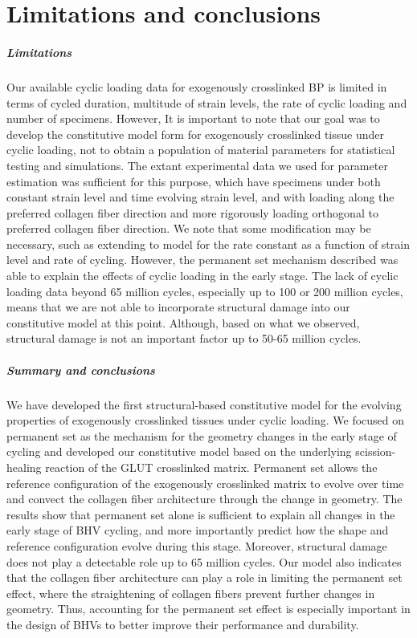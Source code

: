 \section{Limitations and conclusions}

\subparagraph{Limitations} 
	Our available cyclic loading data for exogenously crosslinked BP is limited in terms of cycled duration, multitude of strain levels, the rate of cyclic loading and number of specimens. 
	However, It is important to note that our goal was to develop the constitutive model form for exogenously crosslinked tissue under cyclic loading, not to obtain a population of material parameters for statistical testing and simulations. 
	The extant experimental data we used for parameter estimation was sufficient for this purpose, which have specimens under both constant strain level and time evolving strain level, and with loading along the preferred collagen fiber direction and more rigorously loading orthogonal to preferred collagen fiber direction.
	We note that some modification may be necessary, such as extending to model for the rate constant as a function of strain level and rate of cycling. 
	However, the permanent set mechanism described was able to explain the effects of cyclic loading in the early stage. 
	The lack of cyclic loading data beyond 65 million cycles, especially up to 100 or 200 million cycles, means that we are not able to incorporate structural damage into our constitutive model at this point. 
	Although, based on what we observed, structural damage is not an important factor up to 50-65 million cycles. 

\subparagraph{Summary and conclusions}
	We have developed the first structural-based constitutive model for the evolving properties of exogenously crosslinked tissues under cyclic loading. 
	We focused on permanent set as the mechanism for the geometry changes in the early stage of cycling and developed our constitutive model based on the underlying scission-healing reaction of the GLUT crosslinked matrix. 
	Permanent set allows the reference configuration of the exogenously crosslinked matrix to evolve over time and convect the collagen fiber architecture through the change in geometry.
	The results show that permanent set alone is sufficient to explain all changes in the early stage of BHV cycling, and more importantly predict how the shape and reference configuration evolve during this stage.
	Moreover, structural damage does not play a detectable role up to 65 million cycles. 
	Our model also indicates that the collagen fiber architecture can play a role in limiting the permanent set effect, where the straightening of collagen fibers prevent further changes in geometry. 
	Thus, accounting for the permanent set effect is especially important in the design of BHVs to better improve their performance and durability. 